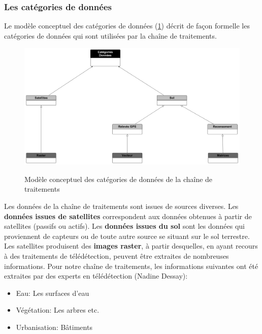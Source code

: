 \subsubsection{Les catégories de données}
Le modèle conceptuel des catégories de données (\ref{ModeleDonneesMin}) décrit de façon formelle les catégories de données qui sont utilisées par la chaîne de traitements.\\

\begin{figure}[H]
\begin{center}
\includegraphics[width=16cm]{ModeleDonneesMin}\\
\caption{\label{ModeleDonneesMin} Modèle conceptuel des catégories de données de la chaîne de traitements}
\end{center}
\end{figure}


Les données de la chaîne de traitements sont issues de sources diverses. Les \textbf{données issues de satellites} correspondent aux données obtenues à partir de satellites (passifs ou actifs).
Les \textbf{données issues du sol} sont les données qui proviennent de capteurs ou de toute autre source se situant sur le sol terrestre. \\

Les satellites produisent des \textbf{images raster}, à partir desquelles, en ayant recours à des traitements de télédétection, peuvent être extraites de nombreuses informations. Pour notre chaîne de traitements, les informations suivantes ont été extraites par des experts en télédétection (Nadine Dessay):\\

\begin{itemize}
\item Eau: Les surfaces d'eau
\item Végétation: Les arbres etc.
\item Urbanisation: Bâtiments\\
\end{itemize}

